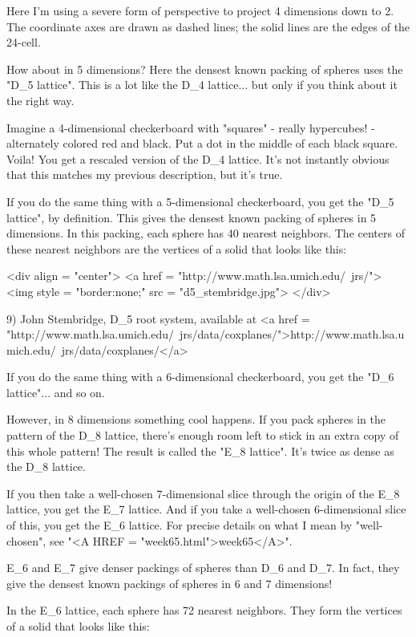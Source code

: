 Here I'm using a severe form of perspective to project 4 dimensions down 
to 2.  The coordinate axes are drawn as dashed lines; the solid lines are 
the edges of the 24-cell.

How about in 5 dimensions?  Here the densest known packing of spheres
uses the "D_{5} lattice".  This is a lot like the D_{4}
lattice... but only if you think about it the right way.

Imagine a 4-dimensional checkerboard with "squares" - really
hypercubes! - alternately colored red and black.  Put a dot in the
middle of each black square.  Voila!  You get a rescaled version of
the D_{4} lattice.  It's not instantly obvious that this matches my
previous description, but it's true.

If you do the same thing with a 5-dimensional checkerboard, you get 
the "D_{5} lattice", by definition.  This gives the densest known 
packing of spheres in 5 dimensions.  In this packing, each sphere
has 40 nearest neighbors.  The centers of these nearest neighbors 
are the vertices of a solid that looks like this:

<div align = "center">
<a href = "http://www.math.lsa.umich.edu/~jrs/">
<img style = "border:none;" src = "d5_stembridge.jpg">
</div>


9) John Stembridge, D_{5} root system, available at
<a href = "http://www.math.lsa.umich.edu/~jrs/data/coxplanes/">http://www.math.lsa.umich.edu/~jrs/data/coxplanes/</a>

If you do the same thing with a 6-dimensional checkerboard, you get
the "D_{6} lattice"... and so on.  

However, in 8 dimensions something cool happens.  If you pack spheres
in the pattern of the D_{8} lattice, there's enough room left
to stick in an extra copy of this whole pattern!  The result is called
the "E_{8} lattice".  It's twice as dense as the
D_{8} lattice.

If you then take a well-chosen 7-dimensional slice through the origin
of the E_{8} lattice, you get the E_{7} lattice.  And
if you take a well-chosen 6-dimensional slice of this, you get the
E_{6} lattice.  For precise details on what I mean by
"well-chosen", see "<A HREF =
"week65.html">week65</A>".

E_{6} and E_{7} give denser packings of spheres than
D_{6} and D_{7}.  In fact, they give the densest known packings
of spheres in 6 and 7 dimensions!

In the E_{6} lattice, each sphere has 72 nearest neighbors.  They form
the vertices of a solid that looks like this:

